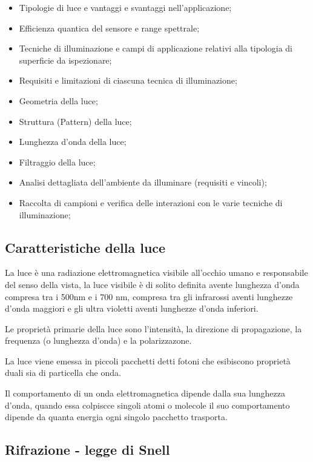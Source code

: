 \begin{itemize}
	\item Tipologie di luce e vantaggi e svantaggi nell'applicazione;
	\item Efficienza quantica del sensore e range spettrale;
	\item Tecniche di illuminazione e campi di applicazione relativi alla tipologia di superficie da ispezionare;
	\item Requisiti e limitazioni di ciascuna tecnica di illuminazione;
	\item Geometria della luce;
	\item Struttura (Pattern) della luce;
	\item Lunghezza d'onda della luce;
	\item Filtraggio della luce;
	\item Analisi dettagliata dell'ambiente da illuminare (requisiti e vincoli);
	\item Raccolta di campioni e verifica delle interazioni con le varie tecniche di illuminazione;
\end{itemize}

\subsection{Caratteristiche della luce}

La luce è una radiazione elettromagnetica visibile all'occhio umano e responsabile del senso della vista,
la luce visibile è di solito definita avente lunghezza d'onda compresa tra i 500nm e i 700 nm, compresa tra gli infrarossi aventi lunghezze d'onda maggiori e gli ultra violetti aventi lunghezze d'onda inferiori.

Le proprietà primarie della luce sono l'intensità, la direzione di propagazione, la frequenza (o lunghezza d'onda) e la polarizzazone.

La luce viene emessa in piccoli pacchetti detti fotoni che esibiscono proprietà duali sia di particella che onda.

Il comportamento di un onda elettromagnetica dipende dalla sua lunghezza d'onda, quando essa colpiscce singoli atomi o molecole il suo comportamento dipende da quanta energia ogni singolo pacchetto trasporta.

\subsection{Rifrazione - legge di Snell}

